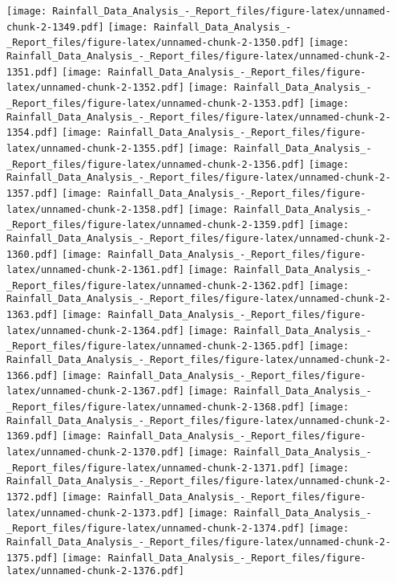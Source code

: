 \documentclass[
]{article}
\begin{document}
\texttt{[image: Rainfall\_Data\_Analysis\_-\_Report\_files/figure-latex/unnamed-chunk-2-1349.pdf]}
\texttt{[image: Rainfall\_Data\_Analysis\_-\_Report\_files/figure-latex/unnamed-chunk-2-1350.pdf]}
\texttt{[image: Rainfall\_Data\_Analysis\_-\_Report\_files/figure-latex/unnamed-chunk-2-1351.pdf]}
\texttt{[image: Rainfall\_Data\_Analysis\_-\_Report\_files/figure-latex/unnamed-chunk-2-1352.pdf]}
\texttt{[image: Rainfall\_Data\_Analysis\_-\_Report\_files/figure-latex/unnamed-chunk-2-1353.pdf]}
\texttt{[image: Rainfall\_Data\_Analysis\_-\_Report\_files/figure-latex/unnamed-chunk-2-1354.pdf]}
\texttt{[image: Rainfall\_Data\_Analysis\_-\_Report\_files/figure-latex/unnamed-chunk-2-1355.pdf]}
\texttt{[image: Rainfall\_Data\_Analysis\_-\_Report\_files/figure-latex/unnamed-chunk-2-1356.pdf]}
\texttt{[image: Rainfall\_Data\_Analysis\_-\_Report\_files/figure-latex/unnamed-chunk-2-1357.pdf]}
\texttt{[image: Rainfall\_Data\_Analysis\_-\_Report\_files/figure-latex/unnamed-chunk-2-1358.pdf]}
\texttt{[image: Rainfall\_Data\_Analysis\_-\_Report\_files/figure-latex/unnamed-chunk-2-1359.pdf]}
\texttt{[image: Rainfall\_Data\_Analysis\_-\_Report\_files/figure-latex/unnamed-chunk-2-1360.pdf]}
\texttt{[image: Rainfall\_Data\_Analysis\_-\_Report\_files/figure-latex/unnamed-chunk-2-1361.pdf]}
\texttt{[image: Rainfall\_Data\_Analysis\_-\_Report\_files/figure-latex/unnamed-chunk-2-1362.pdf]}
\texttt{[image: Rainfall\_Data\_Analysis\_-\_Report\_files/figure-latex/unnamed-chunk-2-1363.pdf]}
\texttt{[image: Rainfall\_Data\_Analysis\_-\_Report\_files/figure-latex/unnamed-chunk-2-1364.pdf]}
\texttt{[image: Rainfall\_Data\_Analysis\_-\_Report\_files/figure-latex/unnamed-chunk-2-1365.pdf]}
\texttt{[image: Rainfall\_Data\_Analysis\_-\_Report\_files/figure-latex/unnamed-chunk-2-1366.pdf]}
\texttt{[image: Rainfall\_Data\_Analysis\_-\_Report\_files/figure-latex/unnamed-chunk-2-1367.pdf]}
\texttt{[image: Rainfall\_Data\_Analysis\_-\_Report\_files/figure-latex/unnamed-chunk-2-1368.pdf]}
\texttt{[image: Rainfall\_Data\_Analysis\_-\_Report\_files/figure-latex/unnamed-chunk-2-1369.pdf]}
\texttt{[image: Rainfall\_Data\_Analysis\_-\_Report\_files/figure-latex/unnamed-chunk-2-1370.pdf]}
\texttt{[image: Rainfall\_Data\_Analysis\_-\_Report\_files/figure-latex/unnamed-chunk-2-1371.pdf]}
\texttt{[image: Rainfall\_Data\_Analysis\_-\_Report\_files/figure-latex/unnamed-chunk-2-1372.pdf]}
\texttt{[image: Rainfall\_Data\_Analysis\_-\_Report\_files/figure-latex/unnamed-chunk-2-1373.pdf]}
\texttt{[image: Rainfall\_Data\_Analysis\_-\_Report\_files/figure-latex/unnamed-chunk-2-1374.pdf]}
\texttt{[image: Rainfall\_Data\_Analysis\_-\_Report\_files/figure-latex/unnamed-chunk-2-1375.pdf]}
\texttt{[image: Rainfall\_Data\_Analysis\_-\_Report\_files/figure-latex/unnamed-chunk-2-1376.pdf]}
\end{document}
